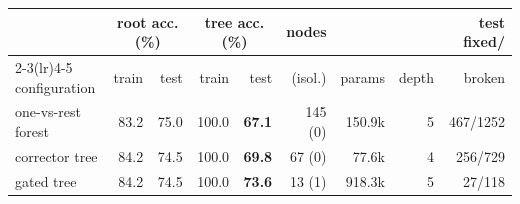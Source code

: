 \begin{tabular}{@{}lrrrrrrrr@{}}\toprule
 & \multicolumn{2}{c}{root acc. (\%)} & \multicolumn{2}{c}{tree acc. (\%)} & nodes & & & test fixed/\\
\cmidrule(lr){2-3}\cmidrule(lr){4-5}
configuration & train & test & train & test & (isol.) & params & depth & broken\\\midrule
one-vs-rest forest & 83.2 & 75.0 & 100.0 & \textbf{67.1} & 145 (0) & 150.9k & 5 & 467/1252\\
corrector tree & 84.2 & 74.5 & 100.0 & \textbf{69.8} & 67 (0) & 77.6k & 4 & 256/729\\
gated tree & 84.2 & 74.5 & 100.0 & \textbf{73.6} & 13 (1) & 918.3k & 5 & 27/118\\
\bottomrule\end{tabular}
